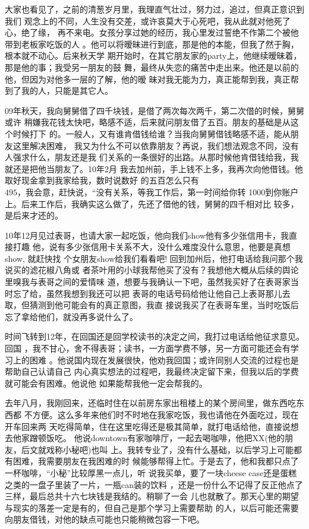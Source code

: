 \documentclass[12pt]{book}
\begin{document}
大家也看见了，之前的清葱岁月里，我理直气壮过，努力过，追过，但真正意识到我们
观念上的不同，人生没有交差，或许哀莫大于心死吧，我从此就对他死了心，绝了缘，
再不来电。女孩分享过她的经历，我心里发过誓绝不作第二个被他带到老板家吃饭的人
。他可以将暧昧进行到底，那是他的本能，但我了然于胸，根本就不动心。后来秋天学
期开始时，在其它朋友家的party上，他继续暧昧着，那是他的事；我受另一朋友的鼓
舞，最终从失恋的痛苦中走出来。他还是以前的他，但因为对他多一层的了解，他的暧
昧对我无能为力，真正能帮到我，真正帮到了我的人，只能是其它人。

09年秋天，我向舅舅借了四千块钱，是借了两次每次两千，第二次借的时候，舅舅或许
稍嫌我花钱太快吧，略感不适，后来就问朋友借了五百。朋友的基础是从这个时候打下
的。一般人，又有谁肯借钱给谁？当我向舅舅借钱略感不适，能从朋友这里解决困难，
我又为什么不可以依靠朋友？再说，我们想法观念不同，没有人强求什么，朋友还是我
们关系的一条很好的出路。从那时候他肯借钱给我，我就还是把他当朋友了。10年2月
我去加州前，手上钱不上多，我再次向他借钱。他取好现金拿到我家给我，数时说数好
的五百怎么只有$495，我会意，赶快说，“没有关系，等我工作后，第一时间给你转$
1000到你账户上。后来工作后，我确实这么做了，先还了借他的钱，舅舅的四千相对比
较多，是后来才还的。

10年12月见过表哥，也请大家一起吃饭，他向我们show他有多少张信用卡，我直接打趣
他，说有多少张信用卡关系不大，没什么难度没什么意思，他要是真想show, 就赶快找
个女朋友show给我们看看吧! 回到加州后，他打电话给我问那个我说买的滤花椒八角或
者茶叶用的小球我帮他买了没有？我想他大概从后续的舆论里嗅我与表哥之间的爱情味
道，想要与我确认一下吧，虽然我买好了在表哥家当时忘了给，虽然我想到我还可以把
表哥的电话号码给他让他自己上表哥那儿去取，但猜测到他可能会有的真正意图，我直
接说我买了在表哥车里，当时吃饭后忘了拿给他们，就没再多说什么了。

时间飞转到12年，在回国还是回学校读书的决定之间，我打过电话给他征求意见。回国
，我不甘心，舍不得表哥；读书，一方面学费不够，另一方面可能还会有学习上的困难
。他说国内现在发展很快，他劝我回国；或许同别人交流的过程也是帮助自己认请自己
内心真实想法的过程吧，我最终决定留下来，但我以后的学费就可能会有困难。他说他
如果能帮我他一定会帮我的。

去年八月，我刚回来，还临时住在以前房东家出租楼上的某个房间里，做东西吃东西都
不方便。这么多年来他们时不时地在我家吃饭，我也请他在外面吃过，现在开车回来两
天吃得简单，住在这里吃得还是极其简单，就打电话给他，直接说想去他家蹭顿饭吃。
他说downtown有家咖啡厅，一起去喝咖啡，他把XX(他的朋友，后文就戏称小秘吧)也叫
上。我转专业了，没有什么基础，以后学习上可能都有困难，我需要朋友在我困难的时
候能够帮得上忙。于是去了，他和我都只点了一杯咖啡，“小秘”比较厚黑一点儿，听
说我买单，要了一块cheese case还是蛋糕之类的一盘子里装了一片，一瓶can装的饮料
，还是一份什么不记得了反正他点了三样，最后总共十六七块钱是我结的。稍聊了一会
儿也就散了。那天心里的期望与现实的落差一定是有的，但自己是那个学习上需要帮助
的人，以后可能还需要向朋友借钱，对他的缺点可能也只能稍微包容一下吧。
\end{document}
